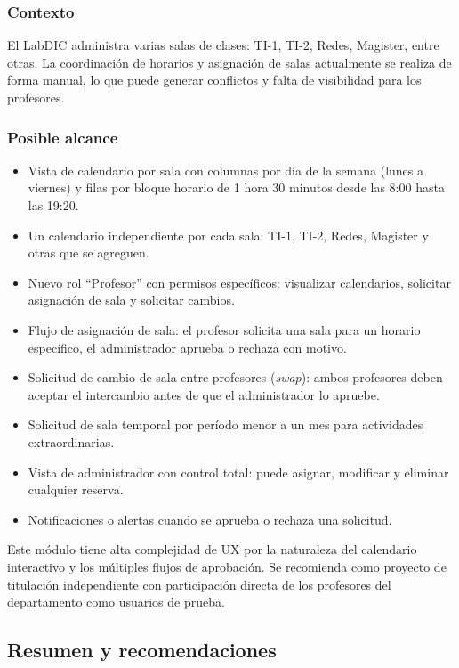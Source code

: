 \subsubsection*{Contexto}

El LabDIC administra varias salas de clases: TI-1, TI-2, Redes, Magister, entre 
otras. La coordinación de horarios y asignación de salas actualmente se realiza de 
forma manual, lo que puede generar conflictos y falta de visibilidad para los 
profesores.

\subsubsection*{Posible alcance}

\begin{itemize}
	\item Vista de calendario por sala con columnas por día de la semana (lunes a 
	viernes) y filas por bloque horario de 1 hora 30 minutos desde las 8:00 hasta 
	las 19:20.
	\item Un calendario independiente por cada sala: TI-1, TI-2, Redes, Magister y 
	otras que se agreguen.
	\item Nuevo rol ``Profesor'' con permisos específicos: visualizar calendarios, 
	solicitar asignación de sala y solicitar cambios.
	\item Flujo de asignación de sala: el profesor solicita una sala para un horario 
	específico, el administrador aprueba o rechaza con motivo.
	\item Solicitud de cambio de sala entre profesores (\textit{swap}): ambos 
	profesores deben aceptar el intercambio antes de que el administrador lo apruebe.
	\item Solicitud de sala temporal por período menor a un mes para actividades 
	extraordinarias.
	\item Vista de administrador con control total: puede asignar, modificar y 
	eliminar cualquier reserva.
	\item Notificaciones o alertas cuando se aprueba o rechaza una solicitud.
\end{itemize}

Este módulo tiene alta complejidad de UX por la naturaleza del calendario interactivo 
y los múltiples flujos de aprobación. Se recomienda como proyecto de titulación 
independiente con participación directa de los profesores del departamento como 
usuarios de prueba.

\subsection{Resumen y recomendaciones}

